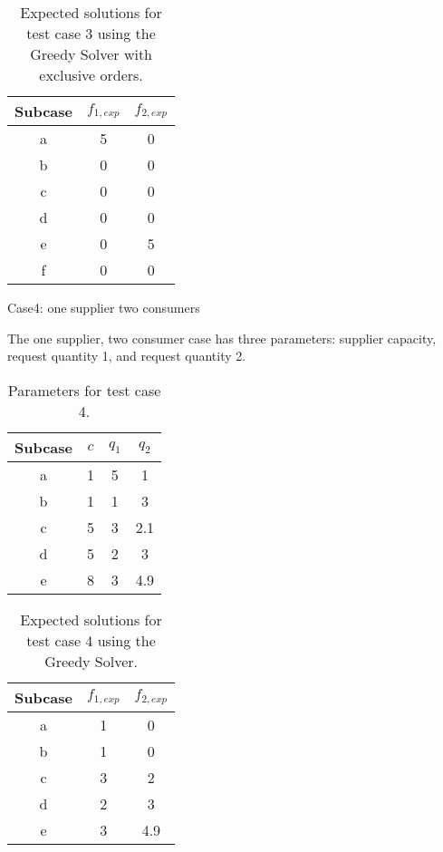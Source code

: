 \begin{table}[ht]
  \begin{center}
    \caption{Expected solutions for test case 3 using the Greedy Solver with 
      exclusive orders.}
    \begin{tabular}{ccc}
    \toprule
    Subcase & $f_{1, exp}$ & $f_{2, exp}$\\
    \midrule
    a & 5  & 0   \\
    b & 0  & 0   \\
    c & 0  & 0   \\
    d & 0  & 0   \\
    e & 0  & 5   \\
    f & 0  & 0   \\
    \bottomrule
    \end{tabular}
  \end{center}
\end{table}

Case4: one supplier two consumers

The one supplier, two consumer case has three parameters: supplier capacity,
request quantity 1, and request quantity 2.

\begin{table}[ht]
  \begin{center}
    \caption{Parameters for test case 4.}
    \begin{tabular}{cccc}
    \toprule
    Subcase & $c$ & $q_1$ & $q_2$ \\
    \midrule
    a & 1 & 5 & 1    \\
    b & 1 & 1 & 3    \\
    c & 5 & 3 & 2.1  \\
    d & 5 & 2 & 3    \\
    e & 8 & 3 & 4.9  \\
    \bottomrule
    \end{tabular}
  \end{center}
\end{table}

\begin{table}[ht]
  \begin{center}
    \caption{Expected solutions for test case 4 using the Greedy Solver.}
    \begin{tabular}{ccc}
    \toprule
    Subcase & $f_{1, exp}$ & $f_{2, exp}$\\
    \midrule
    a & 1  & 0   \\
    b & 1  & 0   \\
    c & 3  & 2   \\
    d & 2  & 3   \\
    e & 3  & 4.9 \\
    \bottomrule
    \end{tabular}
  \end{center}
\end{table}

